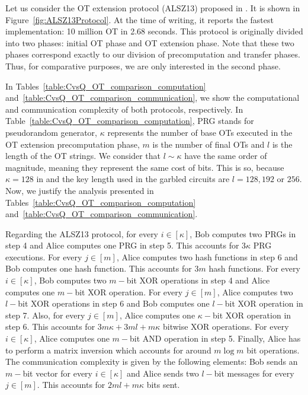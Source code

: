 Let us consider the OT extension protocol (ALSZ13) proposed in \cite{ALSZ13}. It is shown in Figure~\ref{fig:ALSZ13Protocol}. At the time of writing, it reports the fastest implementation: 10 million OT in 2.68 seconds. This protocol is originally divided into two phases: initial OT phase and OT extension phase. Note that these two phases correspond exactly to our division of precomputation and transfer phases. Thus, for comparative purposes, we are only interested in the second phase.

In Tables~\ref{table:CvsQ_OT_comparison_computation} and~\ref{table:CvsQ_OT_comparison_communication}, we show the computational and communication complexity of both protocols, respectively. In Table~\ref{table:CvsQ_OT_comparison_computation}, PRG stands for pseudorandom generator, $\kappa$ represents the number of base OTs executed in the OT extension precomputation phase, $m$ is the number of final OTs and $l$ is the length of the OT strings. We consider that $l \sim \kappa$ have the same order of magnitude, meaning they represent the same cost of bits. This is so, because $\kappa = 128$ in \cite{ALSZ13} and the key length used in the garbled circuits are $l = 128, 192$ or $256$. Now, we justify the analysis presented in Tables~\ref{table:CvsQ_OT_comparison_computation} and~\ref{table:CvsQ_OT_comparison_communication}. 

Regarding the ALSZ13 protocol, for every $i\in[\kappa]$, Bob computes two PRGs in step 4 and Alice computes one PRG in step 5. This accounts for $3\kappa$ PRG executions. For every $j \in[m]$, Alice computes two hash functions in step 6 and Bob computes one hash function. This accounts for $3m$ hash functions. For every $i\in[\kappa]$, Bob computes two $m-$bit XOR operations in step 4 and Alice computes one $m-$bit XOR operation. For every $j \in[m]$, Alice computes two $l-$bit XOR operations in step 6 and Bob computes one $l-$bit XOR operation in step 7. Also, for every $j \in[m]$, Alice computes one $\kappa-$bit XOR operation in step 6. This accounts for $3m\kappa + 3ml + m\kappa$ bitwise XOR operations. For every $i\in[\kappa]$, Alice computes one $m-$bit AND operation in step 5. Finally, Alice has to perform a matrix inversion which accounts for around $m\log m$ bit operations. The communication complexity is given by the following elements: Bob sends an $m-$bit vector for every $i\in[\kappa]$ and Alice sends two $l-$bit messages for every $j \in[m]$. This accounts for $2ml + m\kappa$ bits sent.

